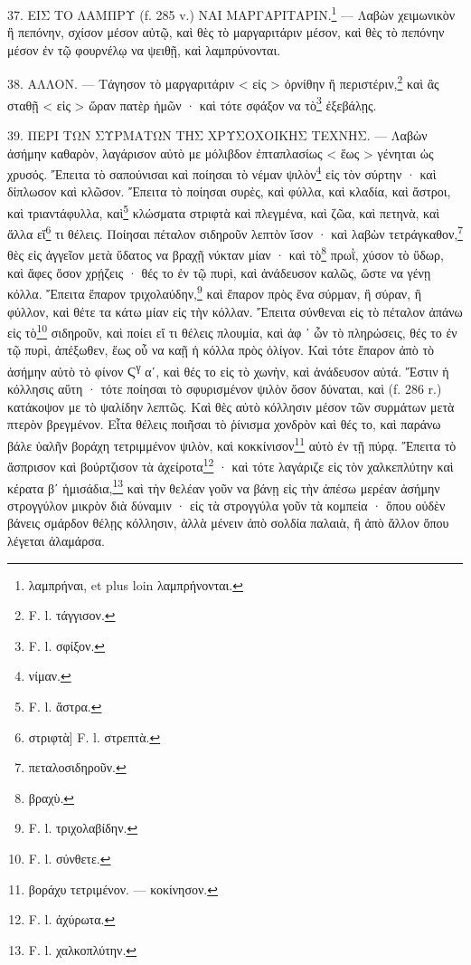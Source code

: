 \documentclass[a4paper, 11pt, oneside, polutonikogreek, french]{article}
\begin{document}
37. ΕΙΣ ΤΟ ΛΑΜΠΡΥ (f. 285 v.) ΝΑΙ ΜΑΡΓΑΡΙΤΑΡΙΝ.\footnote{λαμπρήναι, et plus loin λαμπρήνονται.} --- Λαβὼν χειμωνικὸν ἢ πεπόνην, σχίσον μέσον αὐτῷ, καὶ θὲς τὸ μαργαριτάριν μέσον, καὶ θὲς τὸ πεπόνην μέσον ἐν τῷ φουρνέλῳ να ψειθῇ, καὶ λαμπρύνονται.

38. ΑΛΛΟΝ. --- Τάγησον τὸ μαργαριτάριν < εἰς > ὀρνίθην ἢ περιστέριν,\footnote{F. l. τάγγισον.} καὶ ἂς σταθῇ < εἰς > ὥραν πατὲρ ἡμῶν · καὶ τότε σφάξον να τὸ\footnote{F. l. σφίξον.} ἐξεβάλῃς.

39. ΠΕΡΙ ΤΩΝ ΣΥΡΜΑΤΩΝ ΤΗΣ ΧΡΥΣΟΧΟΙΚΗΣ ΤΕΧΝΗΣ. --- Λαβὼν ἀσήμην καθαρὸν, λαγάρισον αὐτὸ με μόλιβδον ἐπταπλασίως < ἕως > γένηται ὠς χρυσός. Ἔπειτα τὸ σαπούνισαι καὶ ποίησαι τὸ νέμαν ψιλὸν\footnote{νίμαν.} εἰς τὸν σύρτην · καὶ δίπλωσον καὶ κλῶσον. Ἔπειτα τὸ ποίησαι συρὲς, καὶ φύλλα, καὶ κλαδία, καὶ ἄστροι, καὶ τριαντάφυλλα, καὶ\footnote{F. l. ἄστρα.} κλώσματα στριφτὰ καὶ πλεγμένα, καὶ ζῶα, καὶ πετηνὰ, καὶ ἄλλα εἴ\footnote{στριφτὰ] F. l. στρεπτὰ.} τι θέλεις. Ποίησαι πέταλον σιδηροῦν λεπτὸν ἵσον · καὶ λαβὼν τετράγκαθον,\footnote{πεταλοσιδηροῦν.} θὲς εἰς ἀγγεῖον μετὰ ὕδατος να βραχῇ νύκταν μίαν · καὶ τὸ\footnote{βραχὺ.} πρωῒ, χύσον τὸ ὕδωρ, καὶ ἄφες ὅσον χρῄζεις · θές το ἐν τῷ πυρὶ, καὶ ἀνάδευσον καλῶς, ὥστε να γένῃ κόλλα. Ἔπειτα ἔπαρον τριχολαύδην,\footnote{F. l. τριχολαβίδην.} καὶ ἔπαρον πρὸς ἕνα σύρμαν, ἢ σύραν, ἢ φύλλον, καὶ θέτε τα κάτω μίαν εἰς τὴν κόλλαν. Ἔπειτα σύνθεναι εἰς τὸ πέταλον ἀπάνω εἰς τὸ\footnote{F. l. σύνθετε.} σιδηροῦν, καὶ ποίει εἴ τι θέλεις πλουμία, καὶ ἀφ ᾽ ὧν τὸ πληρώσεις, θές το ἐν τῷ πυρὶ, ἀπέξωθεν, ἕως οὗ να καῇ ἡ κόλλα πρὸς ὀλίγον. Καὶ τότε ἔπαρον ἀπὸ τὸ ἀσήμην αὐτὸ τὸ φίνον Ϛ\textsuperscript{γ} αʹ, καὶ θές το εἰς τὸ χωνὴν, καὶ ἀνάδευσον αὐτά. Ἔστιν ἡ κόλλησις αὕτη · τότε ποίησαι τὸ σφυρισμένον ψιλὸν ὅσον δύναται, καὶ (f. 286 r.) κατάκοψον με τὸ ψαλίδην λεπτῶς. Καὶ θὲς αὐτὸ κόλλησιν μέσον τῶν συρμάτων μετὰ πτερὸν βρεγμένον. Εἶτα θέλεις ποιῆσαι τὸ ῥίνισμα χονδρὸν καὶ θές το, καὶ παράνω βάλε ὑαλῆν βοράχη τετριμμένον ψιλὸν, καὶ κοκκίνισον\footnote{βοράχυ τετριμένον. --- κοκίνησον.} αὐτὸ ἐν τῇ πύρᾳ. Ἔπειτα τὸ ἄσπρισον καὶ βούρτζισον τὰ ἀχείροτα\footnote{F. l. ἀχύρωτα.} · καὶ τότε λαγάριζε εἰς τὸν χαλκεπλύτην καὶ κέρατα βʹ ἡμισάδια,\footnote{F. l. χαλκοπλύτην.} καὶ τὴν θελέαν γοῦν να βάνῃ εἰς τὴν ἀπέσω μερέαν ἀσήμην στρογγύλον μικρὸν διὰ δύναμιν · εἰς τὰ στρογγύλα γοῦν τὰ κομπεία · ὅπου οὐδὲν βάνεις σμάρδον θέλῃς κόλλησιν, ἀλλὰ μένειν ἀπὸ σολδία παλαιὰ, ἢ ἀπὸ ἄλλον ὅπου λέγεται ἀλαμάρσα.
\end{document}
